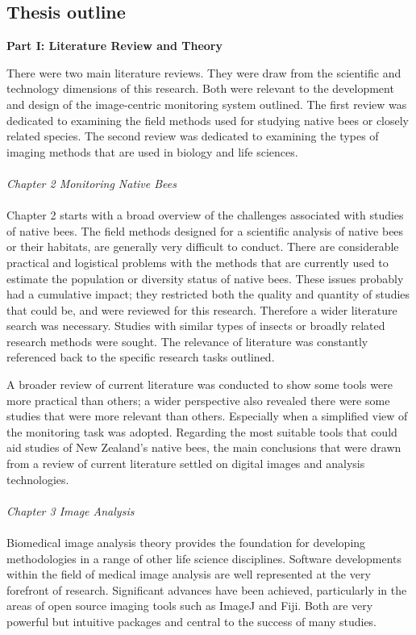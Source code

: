 \subsection{Thesis outline}\label{sec:thesis-outline}
\begin{flushright}
\textbf{Part I: Literature Review and Theory}\\
\end{flushright}
There were two main literature reviews. They were draw from the scientific and technology dimensions of this research. Both were relevant to the development and design of the image-centric monitoring system outlined. The first review was dedicated to examining the field methods used for studying native bees or closely related species. The second review was dedicated to examining the types of imaging methods that are used in biology and life sciences.\\
\\
\emph{Chapter 2 Monitoring Native Bees}\\
\\
Chapter 2 starts with a broad overview of the challenges associated with studies of native bees. The field methods designed for a scientific analysis of native bees or their habitats, are generally very difficult to conduct. There are considerable practical and logistical problems with the methods that are currently used to estimate the population or diversity status of native bees. These issues probably had a cumulative impact; they restricted both the quality and quantity of studies that could be, and were reviewed for this research. Therefore a wider literature search was necessary. Studies with similar types of insects or broadly related research methods were sought. The relevance of literature was constantly referenced back to the specific research tasks outlined. 

A broader review of current literature was conducted to show some tools were more practical than others;  a wider perspective also revealed there were some studies that were more relevant than others. Especially when a simplified view of the monitoring task was adopted. Regarding the most suitable tools that could aid studies of New Zealand's native bees, the main conclusions that were drawn from a review of current literature settled on digital images and analysis technologies. \\
\\
\emph{Chapter 3 Image Analysis}\\
\\
Biomedical image analysis theory provides the foundation for developing methodologies in a range of other life science disciplines. Software developments within the field of medical image analysis are well represented at the very forefront of research. Significant advances have been achieved, particularly in the areas of open source imaging tools such as ImageJ and \acs{Fiji}. Both are very powerful but intuitive packages and central to the success of many studies.
\\

